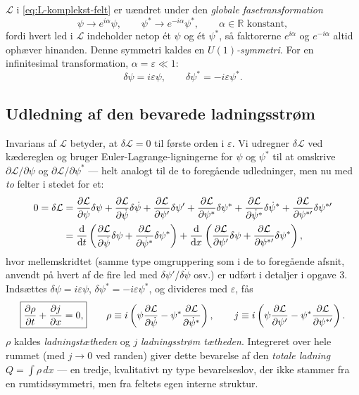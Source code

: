 $\mathcal{L}$ i \eqref{eq:L-komplekst-felt} er uændret under den
\emph{globale fasetransformation}
\begin{equation}
  \psi \to e^{i\alpha}\psi, \qquad \psi^\ast \to e^{-i\alpha}\psi^\ast,
  \qquad \alpha\in\mathbb{R} \text{ konstant},
\end{equation}
fordi hvert led i $\mathcal{L}$ indeholder netop ét $\psi$ og ét
$\psi^\ast$, så faktorerne $e^{i\alpha}$ og $e^{-i\alpha}$ altid
ophæver hinanden. Denne symmetri kaldes en \emph{$U(1)$-symmetri}. For en
infinitesimal transformation, $\alpha=\varepsilon\ll1$:
\begin{equation}
  \delta\psi = i\varepsilon\psi, \qquad \delta\psi^\ast = -i\varepsilon\psi^\ast.
\end{equation}

\subsection{Udledning af den bevarede ladningsstrøm}

Invarians af $\mathcal{L}$ betyder, at $\delta\mathcal{L}=0$ til første
orden i $\varepsilon$. Vi udregner $\delta\mathcal{L}$ ved kædereglen
og bruger Euler-Lagrange-ligningerne for $\psi$ og $\psi^\ast$ til at
omskrive $\partial\mathcal{L}/\partial\psi$ og
$\partial\mathcal{L}/\partial\psi^\ast$ — helt analogt til de to
foregående udledninger, men nu med \emph{to} felter i stedet for et:
\begin{align}
  0 = \delta\mathcal{L} &= \pdv{\mathcal{L}}{\psi}\delta\psi
    + \pdv{\mathcal{L}}{\dot\psi}\delta\dot\psi + \pdv{\mathcal{L}}{\psi'}\delta\psi'
    + \pdv{\mathcal{L}}{\psi^\ast}\delta\psi^\ast
    + \pdv{\mathcal{L}}{\dot\psi^\ast}\delta\dot\psi^\ast
    + \pdv{\mathcal{L}}{\psi^{\ast\prime}}\delta\psi^{\ast\prime} \\
  &= \dv{}{t}\left(\pdv{\mathcal{L}}{\dot\psi}\delta\psi + \pdv{\mathcal{L}}{\dot\psi^\ast}\delta\psi^\ast\right)
   + \dv{}{x}\left(\pdv{\mathcal{L}}{\psi'}\delta\psi + \pdv{\mathcal{L}}{\psi^{\ast\prime}}\delta\psi^\ast\right),
\end{align}
hvor mellemskridtet (samme type omgruppering som i de to foregående
afsnit, anvendt på hvert af de fire led med $\delta\psi'$/$\delta\dot\psi$
osv.) er udført i detaljer i opgave 3. Indsættes
$\delta\psi=i\varepsilon\psi$, $\delta\psi^\ast=-i\varepsilon\psi^\ast$,
og divideres med $\varepsilon$, fås
\begin{equation}
  \boxed{\pdv{\rho}{t} + \pdv{j}{x} = 0,}
  \qquad
  \rho \equiv i\left(\psi\pdv{\mathcal{L}}{\dot\psi} - \psi^\ast\pdv{\mathcal{L}}{\dot\psi^\ast}\right),
  \qquad
  j \equiv i\left(\psi\pdv{\mathcal{L}}{\psi'} - \psi^\ast\pdv{\mathcal{L}}{\psi^{\ast\prime}}\right).
  \label{eq:ladnings-kontinuitet}
\end{equation}
$\rho$ kaldes \emph{ladningstætheden} og $j$ \emph{ladningsstrøm\-
tætheden}. Integreret over hele rummet (med $j\to0$ ved randen) giver
dette bevarelse af den \emph{totale ladning} $Q=\int\rho\,dx$ —
en tredje, kvalitativt ny type bevarelseslov, der ikke stammer fra en
rumtidssymmetri, men fra feltets egen interne struktur.

